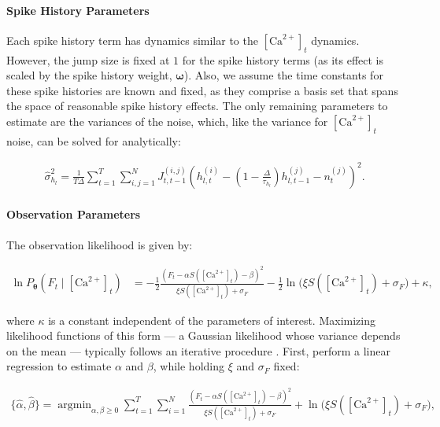 \documentclass[10pt]{article}
\providecommand{\ve}[1]{\boldsymbol{#1}}
\providecommand{\ve}[1]{\boldsymbol{#1}}
\DeclareMathOperator*{\argmin}{argmin}
\newcommand{\thetn}{\ve{\theta}}
\newcommand{\p}{P_{\thetn}}
\newcommand{\Ca}{[\text{Ca}^{2+}]}
\begin{document}
\paragraph{Spike History Parameters}

Each spike history term has dynamics similar to the $\Ca_t$ dynamics. However, the jump size is fixed at $1$ for the spike history terms (as its effect is scaled by the spike history weight, $\ve{\omega}$). Also, we assume the time constants for these spike histories are known and fixed, as they comprise a basis set that spans the space of reasonable spike history effects.  The only remaining parameters to estimate are the variances of the noise, which, like the variance for $\Ca_t$ noise, can be solved for analytically:

\begin{align}
\widehat{\sigma}_{h_l}^2 = \frac{1}{T \Delta} \sum_{t=1}^T \sum_{i,j=1}^N J^{(i,j)}_{t,t-1} \left(h_{l,t}^{(i)} - (1 - \frac{\Delta}{\tau_{h_l}}) h_{l,t-1}^{(j)} -  n_t^{(j)}\right)^2.
\end{align}


\paragraph{Observation Parameters}

The observation likelihood is given by:

\begin{align} \label{eq:obs_lik2}
\ln \p(F_t \mid \Ca_t) &= -\frac{1}{2} \frac{(F_t-\alpha S(\Ca_t) - \beta)^2}{\xi S(\Ca_t) + \sigma_F} -\frac{1}{2} \ln \big(\xi S(\Ca_t) + \sigma_F) + \kappa,
\end{align}

\noindent where $\kappa$ is a constant independent of the parameters of interest. Maximizing likelihood functions of this form --- a Gaussian likelihood whose variance depends on the mean --- typically follows an iterative procedure  \cite{ShumwayStoffer06}.  First, perform a linear regression to estimate $\alpha$ and $\beta$, while holding $\xi$ and $\sigma_F$ fixed:

\begin{align} \label{eq:ab}
\{\widehat{\alpha}, \widehat{\beta}\} = \argmin_{\alpha, \beta \geq 0} \sum_{t=1}^T \sum_{i=1}^N  \frac{(F_t-\alpha S(\Ca_t) - \beta)^2}{\xi S(\Ca_t) + \sigma_F} + \ln\big(\xi S(\Ca_t) + \sigma_F\big),
\end{align}
\end{document}
